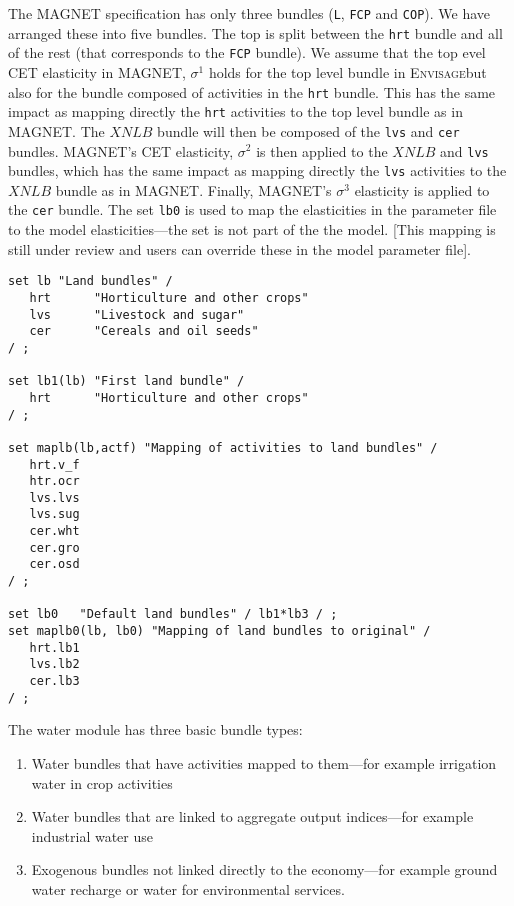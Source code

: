 The MAGNET specification has only three bundles (\texttt{L}, \texttt{FCP} and
\texttt{COP}). We have arranged these into five bundles. The top is split
between the \texttt{hrt} bundle and all of the rest (that corresponds to the
\texttt{FCP} bundle). We assume that the top evel CET elasticity in MAGNET,
$\sigma^1$ holds for the top level bundle in \textsc{Envisage}but also for the
bundle composed of activities in the \texttt{hrt} bundle. This has the same
impact as mapping directly the \texttt{hrt} activities to the top level bundle
as in MAGNET. The $\mathit{XNLB}$ bundle will then be composed of the
\texttt{lvs} and \texttt{cer} bundles. MAGNET's CET elasticity, $\sigma^2$ is
then applied to the $\mathit{XNLB}$ and \texttt{lvs} bundles, which has the same
impact as mapping directly the \texttt{lvs} activities to the $\mathit{XNLB}$
bundle as in MAGNET. Finally, MAGNET's $\sigma^3$ elasticity is applied to the
\texttt{cer} bundle. The set \texttt{lb0} is used to map the elasticities in the
parameter file to the model elasticities---the set is not part of the the model.
[This mapping is still under review and users can override these in the model
parameter file].

\begin{lstlisting}[language=GAMS,
   caption={An example of land configuration}, label=lst:lndBnd]
set lb "Land bundles" /
   hrt      "Horticulture and other crops"
   lvs      "Livestock and sugar"
   cer      "Cereals and oil seeds"
/ ;

set lb1(lb) "First land bundle" /
   hrt      "Horticulture and other crops"
/ ;

set maplb(lb,actf) "Mapping of activities to land bundles" /
   hrt.v_f
   htr.ocr
   lvs.lvs
   lvs.sug
   cer.wht
   cer.gro
   cer.osd
/ ;

set lb0   "Default land bundles" / lb1*lb3 / ;
set maplb0(lb, lb0) "Mapping of land bundles to original" /
   hrt.lb1
   lvs.lb2
   cer.lb3
/ ;
\end{lstlisting}

The water module has three basic bundle types:

\begin{enumerate}
   \item Water bundles that have activities mapped to them---for example
         irrigation water in crop activities
   \item Water bundles that are linked to aggregate output
         indices---for example industrial water use
   \item Exogenous bundles not linked directly to the economy---for example
         ground water recharge or water for environmental services.
\end{enumerate}

